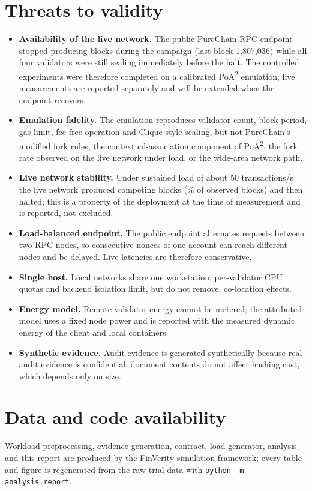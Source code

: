\documentclass[10pt]{article}
\newcommand{\poa}{PoA\textsuperscript{2}}
\begin{document}
\section{Threats to validity}\label{sec:validity}
\begin{itemize}
\item \textbf{Availability of the live network.} The public PureChain RPC endpoint stopped producing blocks during the
campaign (last block 1{,}807{,}036) while all four validators were still sealing immediately before the halt. The
controlled experiments were therefore completed on a calibrated \poa{} emulation; live measurements are reported
separately and will be extended when the endpoint recovers.
\item \textbf{Emulation fidelity.} The emulation reproduces validator count, block period, gas limit, fee-free
operation and Clique-style sealing, but not PureChain's modified fork rules, the contextual-association component of
\poa{}, the fork rate observed on the live network under load, or the wide-area network path.
\item \textbf{Live network stability.} Under sustained load of about 50 transactions/s the live network produced
competing blocks (\LiveReorgPct\% of observed blocks) and then halted; this is a property of the deployment at the
time of measurement and is reported, not excluded.
\item \textbf{Load-balanced endpoint.} The public endpoint alternates requests between two RPC nodes, so consecutive
nonces of one account can reach different nodes and be delayed. Live latencies are therefore conservative.
\item \textbf{Single host.} Local networks share one workstation; per-validator CPU quotas and backend isolation limit,
but do not remove, co-location effects.
\item \textbf{Energy model.} Remote validator energy cannot be metered; the attributed model uses a fixed node power and
is reported with the measured dynamic energy of the client and local containers.
\item \textbf{Synthetic evidence.} Audit evidence is generated synthetically because real audit evidence is
confidential; document contents do not affect hashing cost, which depends only on size.
\end{itemize}

\section*{Data and code availability}
Workload preprocessing, evidence generation, contract, load generator, analysis and this report are produced by the
FinVerity simulation framework; every table and figure is regenerated from the raw trial data with
\texttt{python -m analysis.report}.

\nocite{*}


\end{document}
